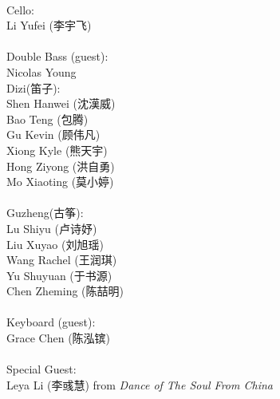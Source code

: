 \documentclass[letter,6pt,poets]{ConcProg}
\begin{document}
\begin{spacing}{1.1}
\begin{multicols}{2}
\\
Cello:\\
Li Yufei (李宇飞)\\
\\
Double Bass (guest):\\
Nicolas Young\\

Dizi(笛子): 				 \\    
Shen Hanwei		(沈漢威)     \\
Bao Teng  (包腾)\\
Gu Kevin   (顾伟凡)               \\
Xiong Kyle (熊天宇)\\
Hong Ziyong (洪自勇)\\
Mo Xiaoting (莫小婷)\\
\\
Guzheng({古筝}):\\
Lu Shiyu (卢诗妤)\\
Liu Xuyao  (刘旭瑶)\\               
Wang Rachel (王润琪) \\
Yu Shuyuan   (于书源)\\
Chen Zheming  (陈喆明)\\
\\
Keyboard (guest):\\
Grace Chen (陈泓镔)
\\
\\
Special Guest:\\
Leya Li (李彧慧)
 \small{ from \emph{ Dance of The Soul From China}}
\\
\end{multicols}
\end{spacing}
\end{document}
